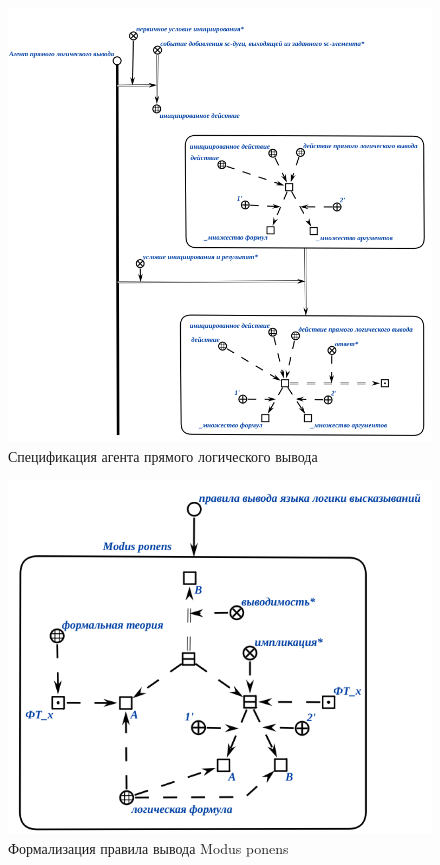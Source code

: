 \begin{figure}[H]
	\includegraphics[scale=0.8]{author/part3/figures/direct_inference_agent.png}
	\caption{Спецификация агента прямого логического вывода}
	\label{fig:direct_inference_agent}
\end{figure}

\begin{figure}[H]
	\includegraphics[scale=0.8]{author/part3/figures/Modus_ponens.png}
	\caption{Формализация правила вывода Modus ponens}
	\label{fig:modus_ponens}
\end{figure}

